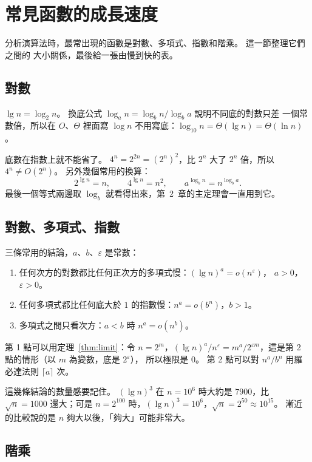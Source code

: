 \section{常見函數的成長速度}
\label{sec:ana-functions}

分析演算法時，最常出現的函數是對數、多項式、指數和階乘。 這一節整理它們之間的
大小關係，最後給一張由慢到快的表。

\subsection{對數}

$\lg n = \log_2 n$。 換底公式 $\log_a n = \log_b n / \log_b a$ 說明不同底的對數只差
一個常數倍，所以在 $O$、$\Theta$ 裡面寫 $\log n$ 不用寫底：$\log_{10} n =
\Theta(\lg n) = \Theta(\ln n)$。

底數在指數上就不能省了。 $4^n = 2^{2n} = (2^n)^2$，比 $2^n$ 大了 $2^n$ 倍，所以
$4^n \ne O(2^n)$。 另外幾個常用的換算：
\[
2^{\lg n} = n, \qquad 4^{\lg n} = n^2, \qquad a^{\log_b n} = n^{\log_b a}.
\]
最後一個等式兩邊取 $\log_b$ 就看得出來，第~2~章的主定理會一直用到它。

\subsection{對數、多項式、指數}

三條常用的結論，$a$、$b$、$\varepsilon$ 是常數：

\begin{enumerate}
\item 任何次方的對數都比任何正次方的多項式慢：$(\lg n)^a = o(n^{\varepsilon})$，
$a > 0$，$\varepsilon > 0$。
\item 任何多項式都比任何底大於 $1$ 的指數慢：$n^a = o(b^n)$，$b > 1$。
\item 多項式之間只看次方：$a < b$ 時 $n^a = o(n^b)$。
\end{enumerate}

第 1 點可以用定理~\ref{thm:limit}：令 $n = 2^m$，$(\lg n)^a / n^{\varepsilon} =
m^a / 2^{\varepsilon m}$，這是第 2 點的情形（以 $m$ 為變數，底是 $2^{\varepsilon}$），
所以極限是 $0$。 第 2 點可以對 $n^a / b^n$ 用羅必達法則 $\lceil a \rceil$ 次。

這幾條結論的數量感要記住。 $(\lg n)^3$ 在 $n = 10^6$ 時大約是 $7900$，比
$\sqrt{n} = 1000$ 還大；可是 $n = 2^{100}$ 時，$(\lg n)^3 = 10^6$，$\sqrt n = 2^{50}
\approx 10^{15}$。 漸近的比較說的是 $n$ 夠大以後，「夠大」可能非常大。

\subsection{階乘}


